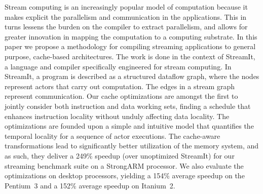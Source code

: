
Stream computing is an increasingly popular model of computation
because it makes explicit the parallelism and communication in the
applications. This in turns lessens the burden on the compiler to
extract parallelism, and allows for greater innovation in mapping the
computation to a computing substrate. In this paper we propose a
methodology for compiling streaming applications to general purpose,
cache-based architectures. The work is done in the context of
StreamIt, a language and compiler specifically engineered for stream
computing. In StreamIt, a program is described as a structured dataflow
graph, where the nodes represent actors that carry out 
computation. The edges in a stream graph represent
communication. Our cache optimizations are amongst the first to 
jointly consider both instruction and data working sets, finding 
a schedule that enhances instruction locality without unduly
affecting data locality.  The
optimizations are founded upon a simple and intuitive model that
quantifies the temporal locality for a sequence of  actor
executions.  The cache-aware transformations lead to significantly
better utilization of the memory system, and as such, they deliver
a 249\% speedup (over unoptimized StreamIt) for our streaming benchmark 
suite on a StrongARM processor.  We also evaluate the optimizations on 
desktop processors, yielding a 154\% average speedup on the Pentium~3 
and a 152\% average speedup on Itanium~2.
